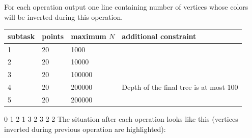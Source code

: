 
For each operation output one line containing number of vertices whose colors will be inverted
during this operation.


\begin{center}
\begin{tabular}{|l|l|l|l|}
\hline
subtask & points & maximum $N$ & additional constraint                  \\ \hline
1       & 20     & 1000      &                                        \\ \hline
2       & 20     & 10000     &                                        \\ \hline
3       & 20     & 100000     &                                        \\ \hline
4       & 20     & 200000    & Depth of the final tree is at most 100 \\ \hline
5       & 20     & 200000    &                                        \\ \hline
\end{tabular}
\end{center}



0
1
2
1
3
2
3
2
2
\sampleCOMMENT
The situation after each operation looks like this (vertices inverted during previous operation are highlighted):
\sampleEND
{}

